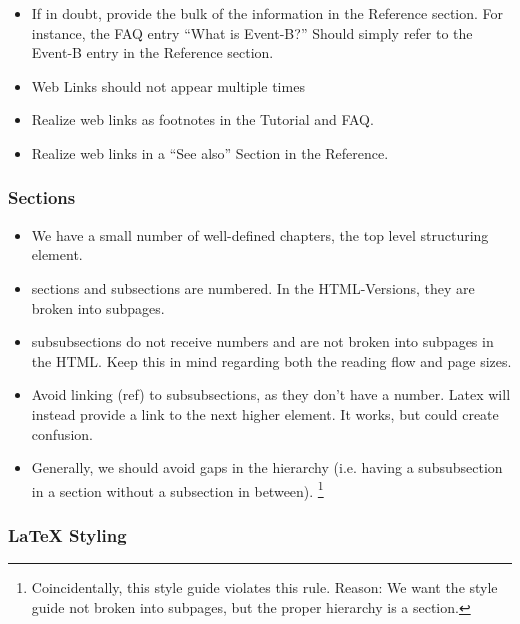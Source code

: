 \begin{itemize}
	\item If in doubt, provide the bulk of the information in the Reference section.  For instance, the FAQ entry ``What is Event-B?''  Should simply refer to the Event-B entry in the Reference section.
	\item Web Links should not appear multiple times
	\item Realize web links as footnotes in the Tutorial and FAQ.
	\item Realize web links in a ``See also'' Section in the Reference.
\end{itemize}

\subsubsection{Sections}

\begin{itemize}
	\item We have a small number of well-defined chapters, the top level structuring element.
	\item sections and subsections are numbered.  In the HTML-Versions, they are broken into subpages.
    \item subsubsections do not receive numbers and are not broken into subpages in the HTML.  Keep this in mind regarding both the reading flow and page sizes.
	\item Avoid linking (ref) to subsubsections, as they don't have a number.  Latex will instead provide a link to the next higher element.  It works, but could create confusion.
	\item Generally, we should avoid gaps in the hierarchy (i.e. having a subsubsection in a section without a subsection in between).
      \footnote{Coincidentally, this style guide violates this rule. Reason: We want the style guide not broken into subpages, but the proper hierarchy is a section.}
\end{itemize}


\subsubsection{\LaTeX{} Styling}

